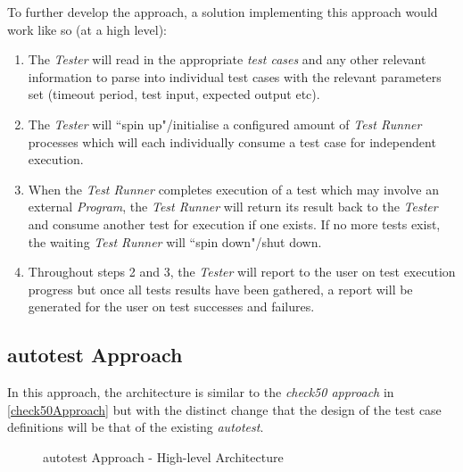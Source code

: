 \documentclass[hidelinks]{report}
\begin{document}
To further develop the approach, a solution implementing this approach would work like so (at a high level):
\begin{enumerate}
	\item The \textit{Tester} will read in the appropriate \textit{test cases} and any other relevant information to parse into individual test cases with the relevant parameters set (timeout period, test input, expected output etc).
	\item The \textit{Tester} will ``spin up"/initialise a configured amount of \textit{Test Runner} processes which will each individually consume a test case for independent execution.
	\item When the \textit{Test Runner} completes execution of a test which may involve an external \textit{Program}, the \textit{Test Runner} will return its result back to the \textit{Tester} and consume another test for execution if one exists. If no more tests exist, the waiting \textit{Test Runner} will ``spin down"/shut down.
	\item Throughout steps 2 and 3, the \textit{Tester} will report to the user on test execution progress but once all tests results have been gathered, a report will be generated for the user on test successes and failures.
\end{enumerate}

\subsection{autotest Approach}

In this approach, the architecture is similar to the \textit{check50 approach} in \autoref{check50Approach} but with the distinct change that the design of the test case definitions will be that of the existing \textit{autotest}.

\begin{figure}[h]
	\centering
	\caption{autotest Approach - High-level Architecture}
	\label{fig:approach2-1}
\end{figure}
\end{document}
